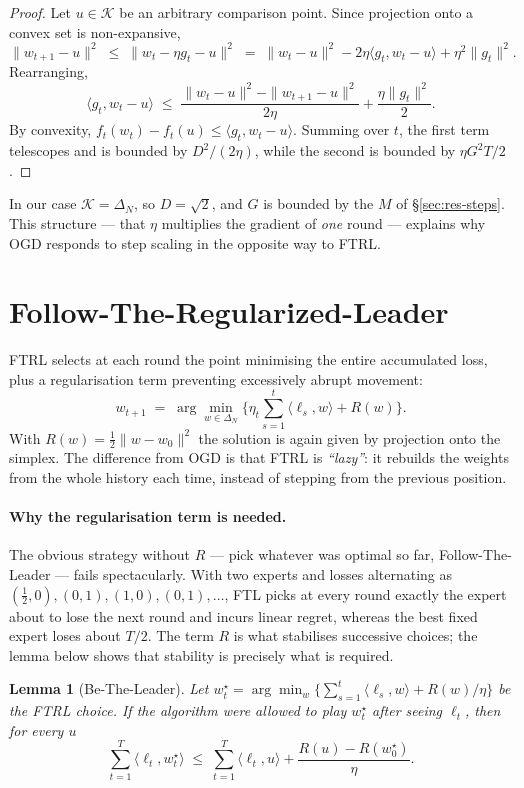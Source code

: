 \documentclass[12pt,a4paper,oneside]{report}
\renewcommand{\_}{\oldunderscore\allowbreak}
\theoremstyle{definition}
\theoremstyle{plain}
\newtheorem{lemma}[theorem]{Lemma}
\theoremstyle{remark}
\begin{document}
\begin{proof}
Let $u \in \mathcal{K}$ be an arbitrary comparison point. Since projection onto a convex set is
non-expansive,
\[
\|w_{t+1}-u\|^2 \;\leq\; \|w_t - \eta g_t - u\|^2
\;=\; \|w_t-u\|^2 - 2\eta \langle g_t, w_t-u\rangle + \eta^2\|g_t\|^2 .
\]
Rearranging,
\[
\langle g_t, w_t - u\rangle \;\leq\; \frac{\|w_t-u\|^2 - \|w_{t+1}-u\|^2}{2\eta}
+ \frac{\eta \|g_t\|^2}{2}.
\]
By convexity, $f_t(w_t) - f_t(u) \leq \langle g_t, w_t-u\rangle$. Summing over $t$, the first
term telescopes and is bounded by $D^2/(2\eta)$, while the second is bounded by
$\eta G^2 T/2$.
\end{proof}

In our case $\mathcal{K}=\Delta_N$, so $D=\sqrt{2}$, and $G$ is bounded by the $M$ of
\S\ref{sec:res-steps}. This structure --- that $\eta$ multiplies the gradient of \emph{one}
round --- explains why OGD responds to step scaling in the opposite way to FTRL.

\section{Follow-The-Regularized-Leader}

FTRL selects at each round the point minimising the entire accumulated loss, plus a
regularisation term preventing excessively abrupt movement:
\[
w_{t+1} \;=\; \arg\min_{w \in \Delta_N} \Big\{ \eta_t \sum_{s=1}^{t} \langle \ell_s, w \rangle
+ R(w) \Big\}.
\]
With $R(w) = \tfrac12\|w - w_0\|^2$ the solution is again given by projection onto the simplex.
The difference from OGD is that FTRL is \emph{``lazy''}: it rebuilds the weights from the whole
history each time, instead of stepping from the previous position.

\paragraph{Why the regularisation term is needed.} The obvious strategy without $R$ --- pick
whatever was optimal so far, Follow-The-Leader --- fails spectacularly. With two experts and
losses alternating as $(\tfrac12,0),(0,1),(1,0),(0,1),\dots$, FTL picks at every round exactly
the expert about to lose the next round and incurs linear regret, whereas the best fixed expert
loses about $T/2$. The term $R$ is what stabilises successive choices; the lemma below shows
that stability is precisely what is required.

\begin{lemma}[Be-The-Leader]
\label{lem:btl}
Let $w^{\star}_t = \arg\min_{w} \{\sum_{s=1}^{t}\langle \ell_s,w\rangle + R(w)/\eta\}$ be the
FTRL choice. If the algorithm were allowed to play $w^{\star}_t$ \emph{after} seeing $\ell_t$,
then for every $u$
\[
\sum_{t=1}^{T} \langle \ell_t, w^{\star}_t\rangle \;\leq\; \sum_{t=1}^{T} \langle \ell_t, u\rangle
+ \frac{R(u) - R(w^{\star}_0)}{\eta}.
\]
\end{lemma}
\end{document}

